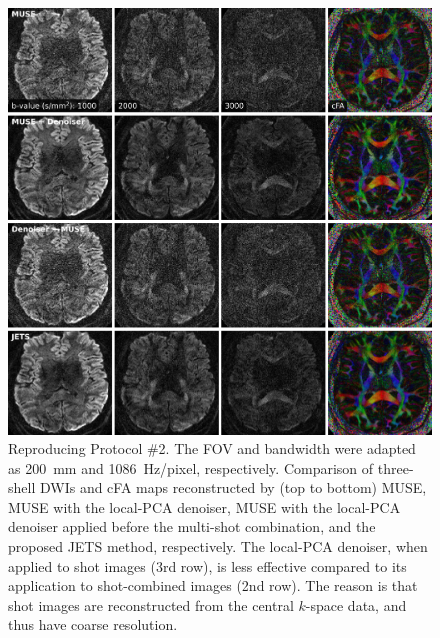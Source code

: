 \documentclass[a4paper,11pt,twoside]{report}
\begin{document}
    \begin{figure}[h]
        \includegraphics[width=\textwidth]{../figures/supp_fig6.png}
        \caption{Reproducing Protocol \#2.
        The FOV and bandwidth were adapted as
        \SI{200}{mm} and 1086~Hz/pixel, respectively.
        Comparison of three-shell DWIs and cFA maps
        reconstructed by (top to bottom)
        MUSE, MUSE with the local-PCA denoiser,
        MUSE with the local-PCA denoiser applied
        before the multi-shot combination,
        and the proposed JETS method, respectively.
        The local-PCA denoiser,
        when applied to shot images (3rd row),
        is less effective compared to
        its application to shot-combined images (2nd row).
        The reason is that shot images are reconstructed
        from the central $k$-space data,
        and thus have coarse resolution.}
        \label{SUPPFIG:6}
    \end{figure}
\end{document}
